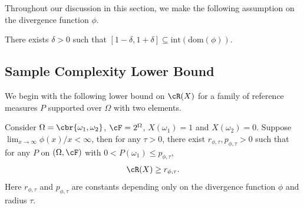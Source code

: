 \documentclass[9pt]{article} %
\numberwithin{equation}{section}
\begin{document}
Throughout our discussion in this section, we make the following assumption on the divergence function $\phi$. 
\begin{assumption}\label{assump_nontrivial_phi}
There exists $\delta > 0$ such that $[1-\delta, 1+\delta] \subseteq \mathrm{int} (\mathrm{dom} (\phi))$. 
\end{assumption}

\subsection{Sample Complexity Lower Bound}

We begin with the following lower bound on $\cR(X)$ for a family of reference measures $P$ supported over $\Omega$ with two elements.


\begin{lemma}\label{lemma_risk_lb}
Consider $\Omega = \cbr{\omega_1, \omega_2}$, $\cF = 2^\Omega$, $X(\omega_1) = 1$ and $X(\omega_2) = 0$. 
Suppose $\lim_{x \to \infty} {\phi(x)}/{x} < \infty$, then for any $\tau > 0$, there exist $r_{\phi,\tau}, p_{\phi, \tau} > 0$ such that for any $P$ on $(\Omega, \cF)$ with $0 < P(\omega_1) \leq  p_{\phi, \tau} $,  
\begin{align*}
\cR(X)  \geq r_{\phi, \tau}.
\end{align*}
Here $r_{\phi,\tau}$ and $p_{\phi, \tau}$ are constants depending only on the divergence function $\phi$ and radius $\tau$.
\end{lemma}
\end{document}
